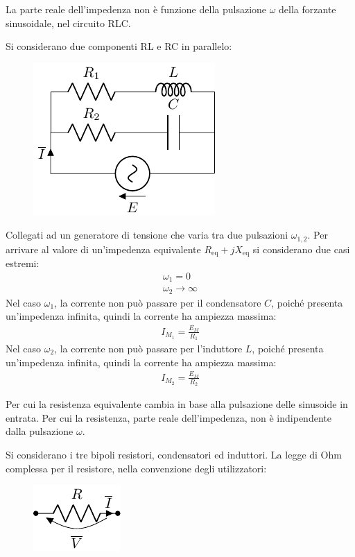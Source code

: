 \documentclass{article}
\numberwithin{equation}{subsection}
\begin{document}
La parte reale dell'impedenza non è funzione della pulsazione $\omega$ della forzante sinusoidale, nel circuito RLC. 

Si considerano due componenti RL e RC in parallelo:
\begin{figure}[H]%
    \centering
    \includegraphics{circuito-rc-rl-parallelo.pdf}%
    \label{fig:circuito-rc-rl-parellelo}
\end{figure}

Collegati ad un generatore di tensione che varia tra due pulsazioni $\omega_{1,2}$. Per arrivare al valore di un'impedenza equivalente $R_\mathrm{eq}+jX_\mathrm{eq}$ si considerano due 
casi estremi:
\begin{gather*}
    \omega_1=0\\
    \omega_2\to\infty
\end{gather*}
Nel caso $\omega_1$, la corrente non può passare per il condensatore $C$, poiché presenta un'impedenza infinita, quindi la corrente ha ampiezza massima:
\begin{gather*}
    I_{M_1}=\displaystyle\frac{E_M}{R_1}
\end{gather*}
Nel caso $\omega_2$, la corrente non può passare per l'induttore $L$, poiché presenta un'impedenza infinita, quindi la corrente ha ampiezza massima:
\begin{gather*}
    I_{M_2}=\displaystyle\frac{E_M}{R_2}
\end{gather*}

Per cui la resistenza equivalente cambia in base alla pulsazione delle sinusoide in entrata. Per cui la resistenza, parte reale dell'impedenza, non è indipendente dalla 
pulsazione $\omega$. 


Si considerano i tre bipoli resistori, condensatori ed induttori. 
La legge di Ohm complessa per il resistore, nella convenzione degli utilizzatori:
\begin{figure}[H]%
    \centering
    \includegraphics{resistore-fasori.pdf}%
    \label{fig:resistore-fasori}
\end{figure}
\end{document}
